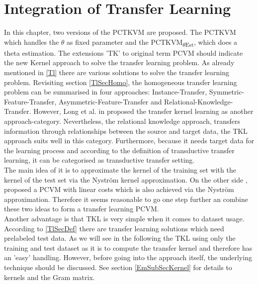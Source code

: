\chapter{Integration of Transfer Learning}\label{In}
In this chapter, two versions of the \ac{PCTKVM} are proposed.
The \acs{PCTKVM} which handles the $\theta$ as fixed parameter and the \acs{PCTKVM}\textsubscript{$\theta$Est}, which does a theta estimation.
The extensions 'TK' to original term \acs{PCVM} should indicate the new Kernel approach to solve the transfer learning problem.
As already mentioned in \ref{Tl} there are various solutions to solve the transfer learning problem.
Revisiting section \ref{TlSecHomo}, the homogeneous transfer learning problem can be summarised in four approaches: Instance-Transfer, Symmetric-Feature-Transfer, Asymmetric-Feature-Transfer and Relational-Knowledge-Transfer.\newline
However, Long et al. in \cite{Long.2015} proposed the transfer kernel learning as another approach-category.
Nevertheless, the relational knowledge approach, transfers information through relationships between the source and target data, the \acs{TKL} approach suits well in this category.
Furthermore, because it needs target data for the learning process and according to the definition of transductive transfer learning, it can be categorised as transductive transfer setting.\\
The main idea of it is to approximate the kernel of the training set with the kernel of the test set via the Nyström kernel approximation.\cite{Long.2015}
On the other side \cite{Schleif.2015}, proposed a \acs{PCVM} with linear costs which is also achieved via the Nyström approximation.
Therefore it seems reasonable to go one step further an combine these two ideas to form a transfer learning \acs{PCVM}.\\
Another advantage is that \acs{TKL} is very simple when it comes to dataset usage.
According to \ref{TlSecDef} there are transfer learning solutions which need prelabeled test data.
As we will see in the following the \acs{TKL} using only the training and test dataset as it is to compute the transfer kernel and therefore has an 'easy' handling.\newline
However, before going into the approach itself, the underlying technique should be discussed.
See section \ref{EmSubSecKernel} for details to kernels and the Gram matrix.
